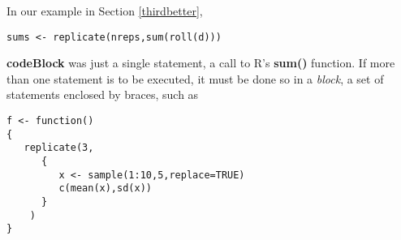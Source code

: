 In our example in Section \ref{thirdbetter},

\begin{lstlisting}
sums <- replicate(nreps,sum(roll(d)))
\end{lstlisting}

{\bf codeBlock} was just a single statement, a call to R's {\bf sum()}
function.  If more than one statement is to be executed, it must be done
so in a {\it block}, a set of statements enclosed by braces, such as

\begin{lstlisting}
f <- function() 
{
   replicate(3,
      {
         x <- sample(1:10,5,replace=TRUE)
         c(mean(x),sd(x))
      }
    )
}
\end{lstlisting}

